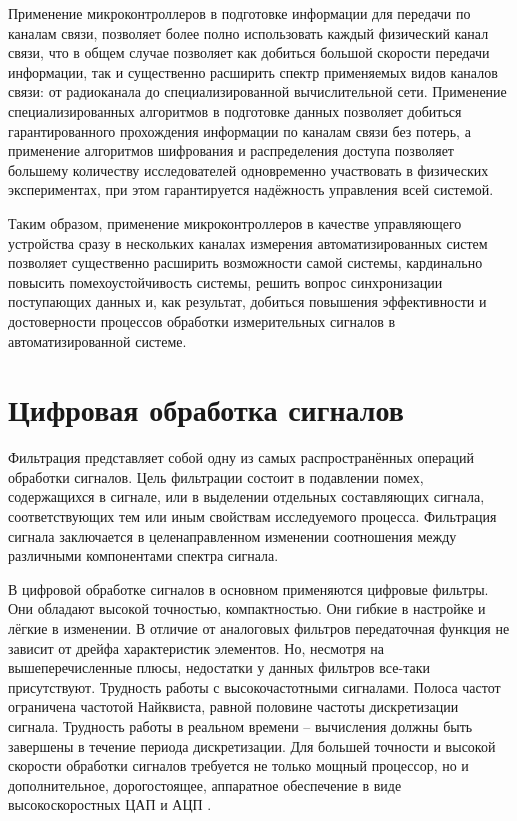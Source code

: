 \documentclass[a4paper, 14pt, titlepage]{extarticle}
\begin{document}
  Применение микроконтроллеров в подготовке информации для передачи по каналам связи, позволяет
  более полно использовать каждый физический канал связи, что в общем случае позволяет как добиться
  большой скорости передачи информации, так и существенно расширить спектр применяемых видов каналов
  связи: от радиоканала до специализированной вычислительной сети. Применение специализированных
  алгоритмов в подготовке данных позволяет добиться гарантированного прохождения информации по
  каналам связи без потерь, а применение алгоритмов шифрования и распределения доступа позволяет
  большему количеству исследователей одновременно участвовать в физических экспериментах, при этом
  гарантируется надёжность управления всей системой.

  Таким образом, применение микроконтроллеров в качестве управляющего устройства сразу в нескольких
  каналах измерения автоматизированных систем позволяет существенно расширить возможности самой
  системы, кардинально повысить помехоустойчивость системы, решить вопрос синхронизации поступающих
  данных и, как результат, добиться повышения эффективности и достоверности процессов обработки
  измерительных сигналов в автоматизированной системе.

  \section{Цифровая обработка сигналов}

  Фильтрация представляет собой одну из самых распространённых операций обработки сигналов. Цель
  фильтрации состоит в подавлении помех, содержащихся в сигнале, или в выделении отдельных
  составляющих сигнала, соответствующих тем или иным свойствам исследуемого процесса. Фильтрация
  сигнала заключается в целенаправленном изменении соотношения между различными компонентами спектра
  сигнала.

  В цифровой обработке сигналов в основном применяются цифровые фильтры. Они обладают высокой
  точностью, компактностью. Они гибкие в настройке и лёгкие в изменении. В отличие от аналоговых
  фильтров передаточная функция не зависит от дрейфа характеристик элементов. Но, несмотря на
  вышеперечисленные плюсы, недостатки у данных фильтров все-таки присутствуют. Трудность работы с
  высокочастотными сигналами. Полоса частот ограничена частотой Найквиста, равной половине частоты
  дискретизации сигнала. Трудность работы в реальном времени – вычисления должны быть завершены в
  течение периода дискретизации. Для большей точности и высокой скорости обработки сигналов
  требуется не только мощный процессор, но и дополнительное, дорогостоящее, аппаратное обеспечение в
  виде высокоскоростных ЦАП и АЦП \cite{glinchenko-digital}.
\end{document}
